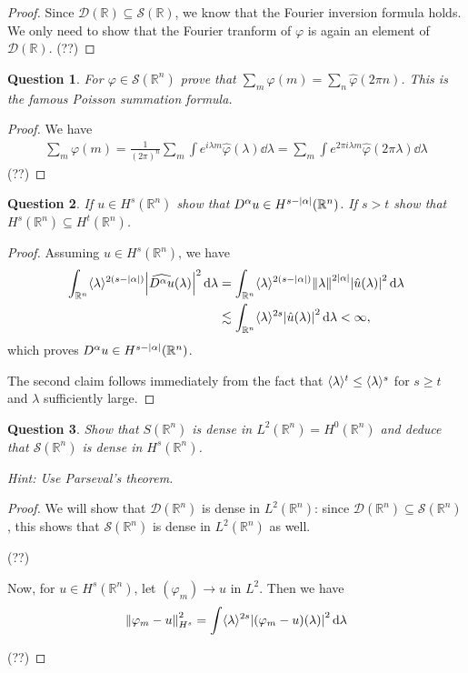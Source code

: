 \documentclass{article}
\theoremstyle{plain}
\newtheorem{question}{Question}
\theoremstyle{remark}
\renewcommand{\phi}{\varphi}
\newcommand{\Bb}{\mathbb}
\newcommand{\Cal}{\mathcal}
\newcommand{\RR}{\Bb R}
\newcommand{\DD}{\Cal D}
\renewcommand\SS{\Cal S}
\DeclarePairedDelimiter{\ang}{\langle}{\rangle}
\newcommand\les\lesssim
\begin{document}
\begin{proof}
Since $\DD(\RR) \subseteq \SS(\RR)$, we know that the Fourier inversion formula holds. We only need to show that the Fourier tranform of $\phi$ is again an element of $\DD(\RR)$. (??)
\end{proof}

\begin{question}
	For $\phi \in \SS(\RR^n)$ prove that $\sum_m \phi(m) = \sum_n \hat\phi(2\pi n)$. This is the famous Poisson summation formula. 
\end{question}

\begin{proof}
	We have
	\begin{align*}
		\sum_m \phi(m) = \frac1{(2\pi)^n} \sum_m \int e^{i\lambda m} \hat \phi(\lambda) \dd{\lambda} = \sum_m \int e^{2\pi i \lambda m} \hat \phi(2\pi \lambda) \dd{\lambda}
	\end{align*}
(??)
\end{proof}

\begin{question}
	If $u \in H^s(\RR^n)$ show that $D^\alpha u\in H^{s - \abs{\alpha}} (\RR^n)$. If $s > t$ show that $H^s(\RR^n) \subseteq H^t(\RR^n)$. 
\end{question}

\begin{proof}
	Assuming $u \in H^s(\RR^n)$, we have
	\begin{align*}
		\int_{\RR^n} \ang{\lambda}^{2(s - \abs{\alpha})} \abs{\widehat{D^\alpha u}(\lambda)}^2 \dd{\lambda}  &= \int_{\RR^n} \ang{\lambda}^{2(s-\abs{\alpha})} \norm{\lambda}^{2\abs{\alpha}} \abs{\hat u(\lambda)}^2 \dd{\lambda} \\
		&\les \int_{\RR^n} \ang{\lambda}^{2s} \abs{\hat u(\lambda)}^2 \dd{\lambda} < \infty, 
	\end{align*}
which proves $D^\alpha u \in H^{s- \abs{\alpha}}(\RR^n)$.

The second claim follows immediately from the fact that $\ang{\lambda}^{t} \leq \ang{\lambda}^s$ for $s \geq t$ and $\lambda$ sufficiently large. 
\end{proof}


\begin{question}
	Show that $S(\RR^n)$ is dense in $L^2(\RR^n) = H^0(\RR^n)$ and deduce that $\SS(\RR^n)$ is dense in $H^s(\RR^n)$.
	
	\emph{Hint:} Use Parseval's theorem. 
\end{question}

\begin{proof}
	We will show that $\DD(\RR^n)$ is dense in $L^2(\RR^n)$: since $\DD(\RR^n) \subseteq \SS(\RR^n)$, this shows that $\SS(\RR^n)$ is dense in $L^2(\RR^n)$ as well. 
	
	(??)
	
	Now, for $u \in H^s(\RR^n)$, let $(\phi_m) \to u$ in $L^2$. Then we have
	\begin{align*}
		\norm{\phi_m - u}_{H^s}^2 = \int \ang{\lambda}^{2s} \abs{(\phi_m - u)(\lambda)}^2 \dd{\lambda}
	\end{align*}

(??)
\end{proof}
\end{document}
